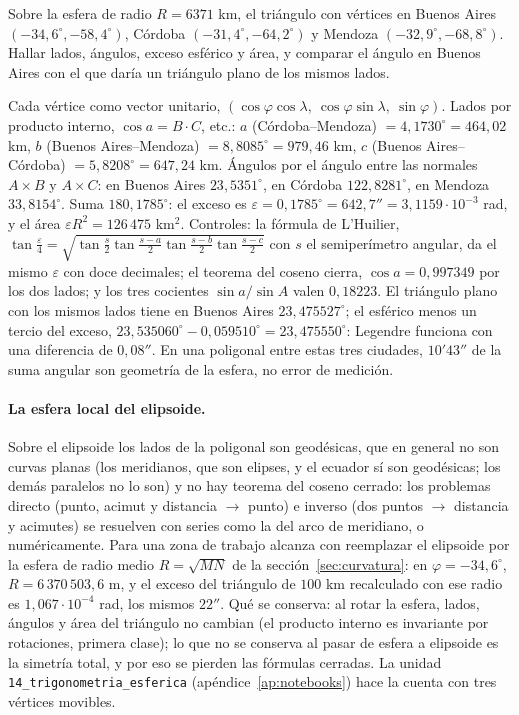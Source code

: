 \begin{enunciado}
Sobre la esfera de radio \(R=6371\) km, el triángulo con vértices en Buenos Aires
\((-34{,}6^\circ,-58{,}4^\circ)\), Córdoba \((-31{,}4^\circ,-64{,}2^\circ)\) y Mendoza
\((-32{,}9^\circ,-68{,}8^\circ)\). Hallar lados, ángulos, exceso esférico y área, y comparar
el ángulo en Buenos Aires con el que daría un triángulo plano de los mismos lados.
\end{enunciado}

Cada vértice como vector unitario,
\((\cos\varphi\cos\lambda,\ \cos\varphi\sin\lambda,\ \sin\varphi)\). Lados por producto
interno, \(\cos a=B\cdot C\), etc.: \(a\) (Córdoba--Mendoza) \(=4{,}1730^\circ=464{,}02\) km,
\(b\) (Buenos Aires--Mendoza) \(=8{,}8085^\circ=979{,}46\) km, \(c\) (Buenos
Aires--Córdoba) \(=5{,}8208^\circ=647{,}24\) km. Ángulos por el ángulo entre las normales
\(A\times B\) y \(A\times C\): en Buenos Aires \(23{,}5351^\circ\), en Córdoba
\(122{,}8281^\circ\), en Mendoza \(33{,}8154^\circ\). Suma \(180{,}1785^\circ\): el exceso
es \(\varepsilon=0{,}1785^\circ=642{,}7''=3{,}1159\cdot10^{-3}\) rad, y el área
\(\varepsilon R^2=126\,475\) km\(^2\). Controles: la fórmula de L'Huilier,
\(\tan\frac\varepsilon4=\sqrt{\tan\frac s2\tan\frac{s-a}2\tan\frac{s-b}2\tan\frac{s-c}2}\)
con \(s\) el semiperímetro angular, da el mismo \(\varepsilon\) con doce decimales; el
teorema del coseno cierra, \(\cos a=0{,}997349\) por los dos lados; y los tres cocientes
\(\sin a/\sin A\) valen \(0{,}18223\). El triángulo plano con los mismos lados tiene en
Buenos Aires \(23{,}475527^\circ\); el esférico menos un tercio del exceso,
\(23{,}535060^\circ-0{,}059510^\circ=23{,}475550^\circ\): Legendre funciona con una
diferencia de \(0{,}08''\). En una poligonal entre estas tres ciudades, \(10'43''\) de la suma angular son
geometría de la esfera, no error de medición.

\paragraph{La esfera local del elipsoide.} Sobre el elipsoide los lados de la poligonal
son geodésicas, que en general no son curvas planas (los meridianos, que son elipses, y
el ecuador sí son geodésicas; los demás paralelos no lo son) y no hay teorema del coseno cerrado: los problemas directo (punto, acimut y
distancia \(\to\) punto) e inverso (dos puntos \(\to\) distancia y acimutes) se resuelven
con series como la del arco de meridiano, o numéricamente. Para una zona de trabajo
alcanza con reemplazar el elipsoide por la esfera de radio medio
\(R=\sqrt{MN}\) de la sección~\ref{sec:curvatura}: en \(\varphi=-34{,}6^\circ\),
\(R=6\,370\,503{,}6\) m, y el exceso del triángulo de \(100\) km recalculado con ese radio
es \(1{,}067\cdot10^{-4}\) rad, los mismos \(22''\). Qué se conserva: al rotar la esfera,
lados, ángulos y área del triángulo no cambian (el producto interno es invariante por
rotaciones, primera clase); lo que no se conserva al pasar de esfera a elipsoide es la
simetría total, y por eso se pierden las fórmulas cerradas. La unidad
\texttt{14\_trigonometria\_esferica} (apéndice~\ref{ap:notebooks}) hace la cuenta con
tres vértices movibles.

